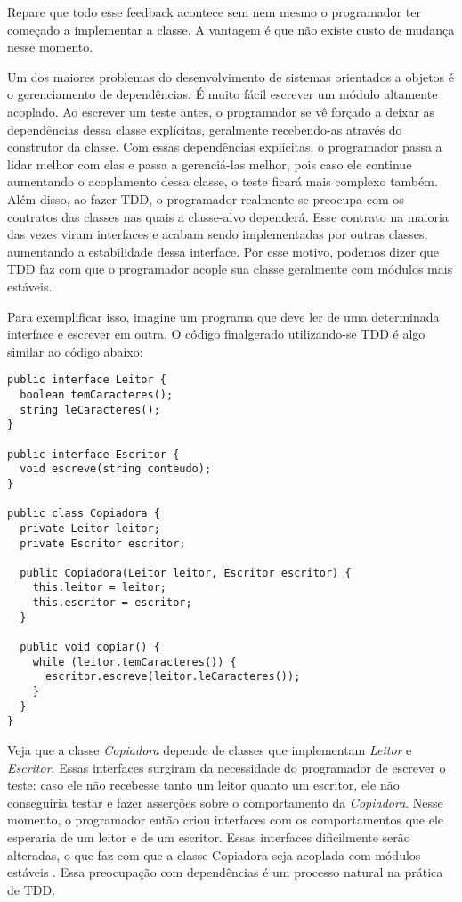 Repare que todo esse feedback acontece sem nem mesmo o programador ter começado a implementar a classe. A vantagem é que
não existe custo de mudança nesse momento.

Um dos maiores problemas do desenvolvimento de sistemas orientados a objetos é o gerenciamento de dependências. É muito fácil
escrever um módulo altamente acoplado.
Ao escrever um teste antes, o programador se vê forçado a deixar as dependências dessa classe explícitas, 
geralmente recebendo-as através do construtor da classe. Com essas dependências explícitas, o programador passa a lidar 
melhor com elas e passa a gerenciá-las melhor, pois caso ele continue aumentando o acoplamento dessa classe, o teste ficará
mais complexo também. Além disso, ao fazer TDD, o programador realmente se preocupa com os contratos das classes nas quais
a classe-alvo dependerá. Esse contrato na maioria das vezes viram interfaces e acabam sendo implementadas por outras classes,
aumentando a estabilidade dessa interface. Por esse motivo, podemos dizer que TDD faz com que o programador acople sua classe
geralmente com módulos mais estáveis. 

Para exemplificar isso, imagine um programa que deve ler de uma determinada interface e escrever em outra. O código finalgerado 
utilizando-se TDD é algo similar ao código abaixo:

\begin{lstlisting}[frame=trbl]
public interface Leitor {
  boolean temCaracteres();
  string leCaracteres();
}

public interface Escritor {
  void escreve(string conteudo);
}

public class Copiadora {
  private Leitor leitor;
  private Escritor escritor;

  public Copiadora(Leitor leitor, Escritor escritor) {
    this.leitor = leitor;
    this.escritor = escritor;
  }

  public void copiar() {
    while (leitor.temCaracteres()) {
      escritor.escreve(leitor.leCaracteres());
    }
  }
}
\end{lstlisting}

Veja que a classe \textit{Copiadora} depende de classes que implementam \textit{Leitor} e \textit{Escritor}. Essas interfaces
surgiram da necessidade do programador de escrever o teste: caso ele não recebesse tanto um leitor quanto um escritor, ele não
conseguiria testar e fazer asserções sobre o comportamento da \textit{Copiadora}. Nesse momento, o programador então criou interfaces
com os comportamentos que ele esperaria de um leitor e de um escritor. Essas interfaces dificilmente serão alteradas, o que faz com que
a classe Copiadora seja acoplada com módulos estáveis \cite{bob-martin}. Essa preocupação com dependências é um processo natural na prática de TDD.

